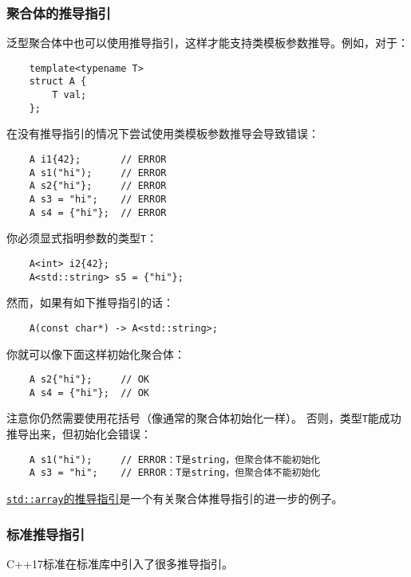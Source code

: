 \subsubsection{聚合体的推导指引}
泛型聚合体中也可以使用推导指引，这样才能支持类模板参数推导。例如，对于：
\begin{lstlisting}
    template<typename T>
    struct A {
        T val;
    };
\end{lstlisting}
在没有推导指引的情况下尝试使用类模板参数推导会导致错误：
\begin{lstlisting}
    A i1{42};       // ERROR
    A s1("hi");     // ERROR
    A s2{"hi"};     // ERROR
    A s3 = "hi";    // ERROR
    A s4 = {"hi"};  // ERROR
\end{lstlisting}
你必须显式指明参数的类型\texttt{T}：
\begin{lstlisting}
    A<int> i2{42};
    A<std::string> s5 = {"hi"};
\end{lstlisting}
然而，如果有如下推导指引的话：
\begin{lstlisting}
    A(const char*) -> A<std::string>;
\end{lstlisting}
你就可以像下面这样初始化聚合体：
\begin{lstlisting}
    A s2{"hi"};     // OK
    A s4 = {"hi"};  // OK
\end{lstlisting}
注意你仍然需要使用花括号（像通常的聚合体初始化一样）。
否则，类型\texttt{T}能成功推导出来，但初始化会错误：
\begin{lstlisting}
    A s1("hi");     // ERROR：T是string，但聚合体不能初始化
    A s3 = "hi";    // ERROR：T是string，但聚合体不能初始化
\end{lstlisting}
\hyperref[ch9.2.6.3]{\texttt{std::array}的推导指引}是一个有关聚合体推导指引的进一步的例子。

\subsubsection{标准推导指引}
C++17标准在标准库中引入了很多推导指引。

